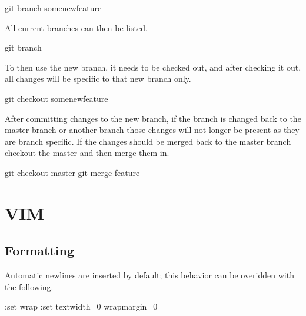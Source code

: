 \documentclass[]{book}
\newenvironment{Shaded}{\begin{snugshade}}{\end{snugshade}}
\newcommand{\FunctionTok}[1]{\textcolor[rgb]{0.00,0.00,0.00}{#1}}
\newcommand{\ExtensionTok}[1]{#1}
\newcommand{\NormalTok}[1]{#1}
\begin{document}
\begin{Shaded}
\begin{Highlighting}[]
\FunctionTok{git}\NormalTok{ branch somenewfeature}
\end{Highlighting}
\end{Shaded}

All current branches can then be listed.

\begin{Shaded}
\begin{Highlighting}[]
\FunctionTok{git}\NormalTok{ branch}
\end{Highlighting}
\end{Shaded}

To then use the new branch, it needs to be checked out, and after
checking it out, all changes will be specific to that new branch only.

\begin{Shaded}
\begin{Highlighting}[]
\FunctionTok{git}\NormalTok{ checkout somenewfeature}
\end{Highlighting}
\end{Shaded}

After committing changes to the new branch, if the branch is changed
back to the master branch or another branch those changes will not
longer be present as they are branch specific. If the changes should be
merged back to the master branch checkout the master and then merge them
in.

\begin{Shaded}
\begin{Highlighting}[]
\FunctionTok{git}\NormalTok{ checkout master}
\FunctionTok{git}\NormalTok{ merge feature}
\end{Highlighting}
\end{Shaded}

\chapter{VIM}\label{vim}

\section{Formatting}\label{formatting}

Automatic newlines are inserted by default; this behavior can be
overidden with the following.

\begin{Shaded}
\begin{Highlighting}[]
\NormalTok{:}\ExtensionTok{set}\NormalTok{ wrap}
\NormalTok{:}\ExtensionTok{set}\NormalTok{ textwidth=0 wrapmargin=0}
\end{Highlighting}
\end{Shaded}
\end{document}
